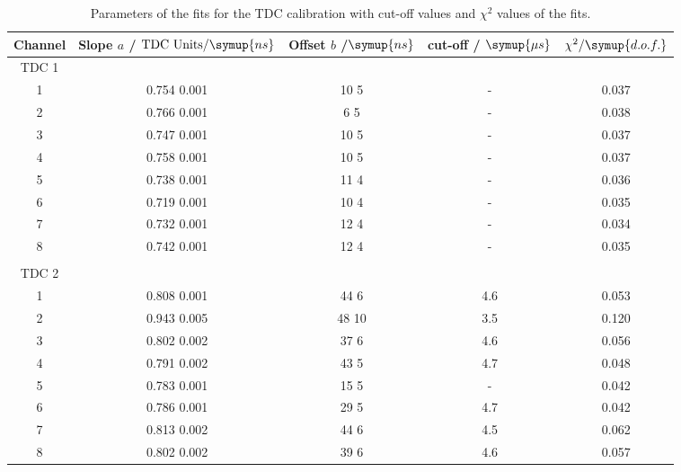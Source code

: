 \begin{table}[!htp]
    \centering
    \caption{Parameters of the fits for the TDC calibration with cut-off values and $\chi^2$ values of the fits.}
    \label{tab:tdc}
    \begin{tabular}{c | c c c | c}
    \toprule
    {Channel} & {Slope $a$ / $\text{TDC Units} / \symup{ns}$} & {Offset $b$ /$\symup{ns}$} & {cut-off / $\symup{\mu s}$} & {$\chi^2/\symup{d.o.f.}$} \\
    \midrule
    TDC 1 & & & \\
    1 & 0.754 \pm{} 0.001 & 10 \pm{} 5& - & 0.037 \\
    2 & 0.766 \pm{} 0.001 & 6  \pm{} 5& -  & 0.038 \\
    3 & 0.747 \pm{} 0.001 & 10 \pm{} 5& - & 0.037 \\
    4 & 0.758 \pm{} 0.001 & 10 \pm{} 5& - & 0.037 \\
    5 & 0.738 \pm{} 0.001 & 11 \pm{} 4& - & 0.036 \\
    6 & 0.719 \pm{} 0.001 & 10 \pm{} 4& - & 0.035 \\
    7 & 0.732 \pm{} 0.001 & 12 \pm{} 4& - & 0.034 \\
    8 & 0.742 \pm{} 0.001 & 12 \pm{} 4& - & 0.035 \\
    & & & &\\ \hline
    TDC 2 & & & & \\
    1 & 0.808 \pm{} 0.001 & 44 \pm{} 6 & 4.6& 0.053 \\
    2 & 0.943 \pm{} 0.005 & 48 \pm{} 10& 3.5 & 0.120 \\
    3 & 0.802 \pm{} 0.002 & 37 \pm{} 6 & 4.6&  0.056 \\
    4 & 0.791 \pm{} 0.002 & 43 \pm{} 5 & 4.7& 0.048 \\
    5 & 0.783 \pm{} 0.001 & 15 \pm{} 5 & -& 0.042 \\
    6 & 0.786 \pm{} 0.001 & 29 \pm{} 5 & 4.7& 0.042 \\
    7 & 0.813 \pm{} 0.002 & 44 \pm{} 6 & 4.5& 0.062 \\
    8 & 0.802 \pm{} 0.002 & 39 \pm{} 6 & 4.6& 0.057 \\
    \bottomrule
    \end{tabular}
    \end{table}